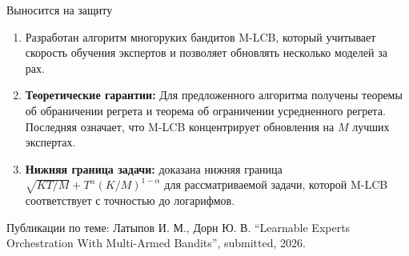 \documentclass[aspectratio=169]{beamer}
\begin{document}
\begin{frame}{Выносится на защиту}
\small
\begin{enumerate}
    \item Разработан алгоритм многоруких бандитов M-LCB, который учитывает скорость обучения экспертов и позволяет обновлять несколько моделей за рах.
    \item \textbf{Теоретические гарантии:} Для предложенного алгоритма получены теоремы об обраничении регрета и теорема об ограничении усредненного регрета. Последняя означает, что M-LCB концентрирует обновления на $M$ лучших экспертах.
    \item \textbf{Нижняя граница задачи:} доказана нижняя граница $\sqrt{KT/M}+T^\alpha(K/M)^{1-\alpha}$ для рассматриваемой задачи, которой M-LCB соответствует с точностью до логарифмов.
\end{enumerate}

\vspace{0.2cm}
\small Публикации по теме: Латыпов И. М., Дорн Ю. В. \enquote{Learnable Experts Orchestration With Multi-Armed Bandits}, submitted, 2026.
\end{frame}
\end{document}
